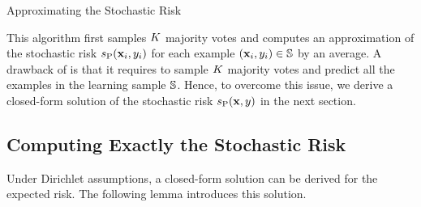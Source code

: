 \begin{algorithm}[H]
 \caption{Approximating the Stochastic Risk}
  \begin{algorithmic}
  \EndFor
  \end{algorithmic}
  \label{chap:mv-sto:algo:mc}
\end{algorithm}

This algorithm first samples $\K$ majority votes and computes an approximation of the stochastic risk $s_{\hyperQ}(\x_i,\y_i)$ for each example $(\x_i,\y_i)\in\S$ by an average.
A drawback of  is that it requires to sample $\K$ majority votes and predict all the examples in the learning sample $\S$.
Hence, to overcome this issue, we derive a closed-form solution of the stochastic risk $s_{\hyperQ}(\x,\y)$ in the next section. 

\subsection{Computing Exactly the Stochastic Risk}
\label{chap:mv-sto:sec:exact}

Under Dirichlet assumptions, a closed-form solution can be derived for the expected risk.
The following lemma introduces this solution.


